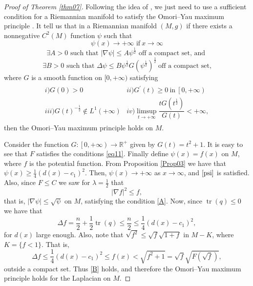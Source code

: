 \documentclass{amsart}
\theoremstyle{plain}
\numberwithin{equation}{section}
\begin{document}
\begin{proof}[Proof of Theorem \ref{thm07}]
    Following the idea of \cite{GR}, we just need to use a sufficient condition for a Riemannian manifold to satisfy the Omori–Yau maximum principle \cite{PRS-Memoirs}. It tell us that in a Riemannian manifold 
$(M,g)$ if there exists a nonnegative $C^2(M)$ function $\psi$
such that
\begin{equation}\label{psi}
    \psi(x) \rightarrow +\infty \,\,\text{if} \ x\to \infty 
\end{equation}
\begin{equation}\label{A}
    \exists A >0\,\,\text{such that} \,\, |\nabla \psi|\leq A \psi^{\frac{1}{2}} \,\, \text{off a compact set, and }
\end{equation}
\begin{equation}\label{B}
    \exists B>0 \,\, \text{such that} \,\, \Delta \psi \leq B \psi^{\frac{1}{2}}G(\psi^{\frac{1}{2}})^{\frac{1}{2}}  \ \text{off a compact set,}
\end{equation}
where $G$ is a smooth function on $[0,+\infty)$ satisfying
\begin{align}\label{eq11}
    \begin{array}{cc}
      i) G(0)>0   & ii) G^{\prime}(t)\geq 0 \ \text{in} \ \left[0, +\infty\right) \\
         iii) G(t)^{-\frac{1}{2}}\notin L^{1}(+\infty) & iv) \limsup_{t\rightarrow +\infty }{\dfrac{tG(t^{\frac{1}{2}})}{G(t)}}<+\infty,
    \end{array}
\end{align}
then the Omori–Yau maximum principle holds on $M$.

Consider the function $G:\left[0, +\infty\right)\rightarrow \mathbb{R}^{+}$ given by $G(t)=t^{2}+1$. It is easy to see that $F$ satisfies the conditions \eqref{eq11}. Finally define  $\psi(x)=f(x)$ on $M$, where $f$ is the potential function. From Proposition \ref{Prop03} we have that  $\psi(x)\geq \frac{1}{4}\left(d(x)-c_1\right)^2$. Then,  $\psi(x)\rightarrow +\infty$ as $x\to\infty$, and $\eqref{psi}$ is satisfied. Also, since $F\leq C$ we saw for $\lambda=\frac{1}{2}$ that $$|\nabla f|^2\leq f,$$
that is, $|\nabla \psi|\leq \sqrt{\psi}$ on $M$, satisfying the condition \eqref{A}. Now, since $\operatorname{tr}(q)\leq0$ we have that \begin{equation*}
     \Delta f= \frac{n}{2} + \frac{1}{2}\operatorname{tr}(q) \leq \frac{n}{2} \leq \frac{1}{4}(d(x)-c_1)^2,
 \end{equation*}
for $d(x)$ large enough. Also, note that $\sqrt{f^2}\leq \sqrt{f}\sqrt{1+f}$ in $M-K$, where $K=\{f<1\}$. That is, 
\begin{equation*}
    \Delta f \leq \frac{1}{4}(d(x)-c_1)^2 \leq f(x) <\sqrt{f^2+1}=\sqrt{f}\sqrt{F(\sqrt{f})},
\end{equation*}
outside a compact set. Thus  \eqref{B} holds, and therefore the Omori–Yau maximum principle
holds for the Laplacian on $M$. 


\end{proof}
\end{document}
